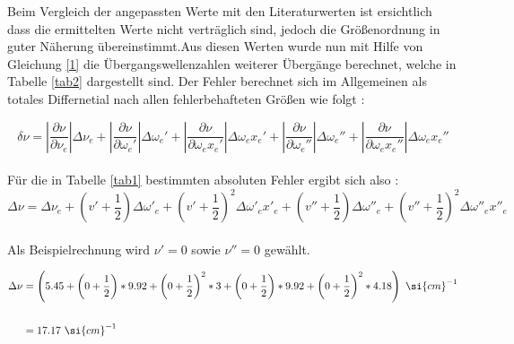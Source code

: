 Beim Vergleich der angepassten Werte mit den Literaturwerten ist ersichtlich dass die ermittelten Werte nicht verträglich sind, jedoch die Größenordnung in guter Näherung übereinstimmt.Aus diesen Werten wurde nun mit Hilfe von Gleichung \ref{1} die Übergangswellenzahlen weiterer Übergänge berechnet, welche in Tabelle \ref{tab2} dargestellt sind.
\newpage
Der Fehler berechnet sich im Allgemeinen als totales Differnetial nach allen fehlerbehafteten Größen wie folgt :

\begin{equation}
\delta \nu = |\frac{\partial \nu}{\partial \nu_e}|\Delta \nu_e+|\frac{\partial \nu}{\partial \omega_e'} |\Delta \omega_e'+|\frac{\partial \nu}{\partial \omega_ex_e'} |\Delta \omega_ex_e'+|\frac{\partial \nu}{\partial \omega_e''} |\Delta \omega_e''+|\frac{\partial \nu}{\partial \omega_ex_e''} |\Delta \omega_ex_e''
\end{equation}
\\
Für die in Tabelle \ref{tab1} bestimmten absoluten Fehler ergibt sich also :
\begin{equation}
\Delta \nu=\Delta \nu_e+\left(v'+\frac{1}{2}\right)\Delta \omega'_e+\left(v'+\frac{1}{2}\right)^2\Delta \omega'_e x'_e+\left(v''+\frac{1}{2}\right)\Delta \omega''_e+\left(v''+\frac{1}{2}\right)^2\Delta \omega''_e x''_e
\end{equation}
\\
Als Beispielrechnung wird $\nu' = 0$ sowie $\nu''=0$ gewählt.

\begin{align}
\notag \Delta \nu&=\left(5.45+\left(0+\frac{1}{2}\right)*9.92+\left(0+\frac{1}{2}\right)^2*3+\left(0+\frac{1}{2}\right)*9.92+ \left(0+\frac{1}{2}\right)^2*4.18\right)~\si{cm}^{-1} \\\notag
\\ &=17.17~\si{cm}^{-1}
\end {align}




